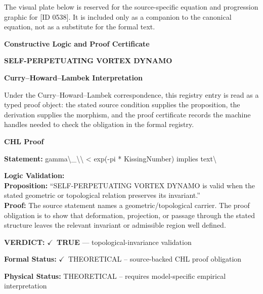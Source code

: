\begingroup\footnotesize\sloppy
The visual plate below is reserved for the source-specific equation and progression graphic for [ID 0538]. It is included only as a companion to the canonical equation, not as a substitute for the formal text.
\par\endgroup
\ifTZPDarkEdition
{}
\fi

\clearpage
\begingroup\tzpsupportsetup
\noindent\textbf{\fontsize{10.8pt}{12.8pt}\selectfont [ID 0538] Constructive Logic and Proof Certificate}\par
\noindent\textbf{\fontsize{10pt}{12pt}\selectfont SELF-PERPETUATING VORTEX DYNAMO}\par
\vspace{0.45em}
\begingroup
\footnotesize
\setlength{\parskip}{0.22em}
\setlength{\parindent}{0pt}
\noindent\textbf{Curry--Howard--Lambek Interpretation}\par
Under the Curry--Howard--Lambek correspondence, this registry entry is read as a typed proof
object: the stated source condition supplies the proposition, the derivation supplies the
morphism, and the proof certificate records the machine handles needed to check the obligation
in the formal registry.

\vspace{0.45em}
\noindent\textbf{CHL Proof}\par
\textbf{Statement:} gamma\textbackslash{}\_\textbackslash{}\textbackslash{} < exp(-pi * KissingNumber) implies text\textbackslash{}

\textbf{Logic Validation:}\\
\textbf{Proposition:} ``SELF-PERPETUATING VORTEX DYNAMO is valid when the stated geometric or topological
relation preserves its invariant.''\\
\textbf{Proof:} The source statement names a geometric/topological carrier. The proof obligation is to
show that deformation, projection, or passage through the stated structure leaves the
relevant invariant or admissible region well defined.

\textbf{VERDICT:} \ensuremath{\checkmark}\ \textbf{TRUE} --- topological-invariance validation

\textbf{Formal Status:} \ensuremath{\checkmark}\ THEORETICAL -- source-backed CHL proof obligation

\textbf{Physical Status:} THEORETICAL -- requires model-specific empirical interpretation
\par\vspace{0.45em}
\par
\ifTZPDarkEdition
{}
\fi
\endgroup
\endgroup
